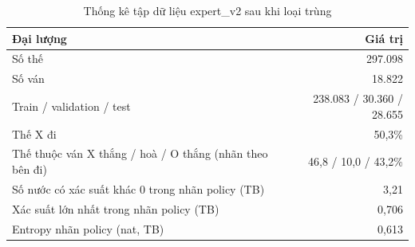 \begin{table}[H]
  \centering
  \small
  \caption{Thống kê tập dữ liệu expert\_v2 sau khi loại trùng}
  \label{tab:cs-mang-dulieu}
  \begin{tabular}{lr}
    \toprule
    Đại lượng & Giá trị \\
    \midrule
    Số thế & 297.098 \\
    Số ván & 18.822 \\
    Train / validation / test & 238.083 / 30.360 / 28.655 \\
    Thế X đi & 50,3\% \\
    Thế thuộc ván X thắng / hoà / O thắng (nhãn theo bên đi) & 46,8 / 10,0 / 43,2\% \\
    Số nước có xác suất khác 0 trong nhãn policy (TB) & 3,21 \\
    Xác suất lớn nhất trong nhãn policy (TB) & 0,706 \\
    Entropy nhãn policy (nat, TB) & 0,613 \\
    \bottomrule
  \end{tabular}
\end{table}
